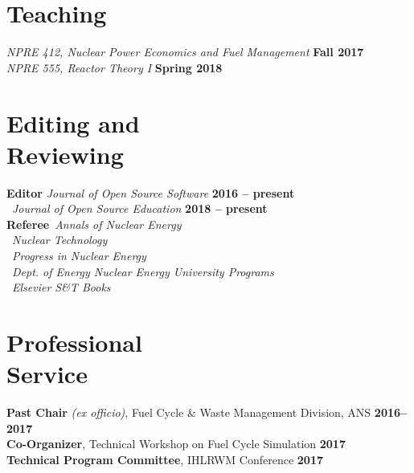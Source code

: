 \documentclass[margin,line]{resume}
\begin{document}
\begin{resume}
    \section{\mysidestyle Teaching}
               \textsl{NPRE 412, Nuclear Power Economics and Fuel Management} \hfill \textbf{Fall 2017}\\
               \textsl{NPRE 555, Reactor Theory I} \hfill \textbf{Spring 2018}
               \vspace{-2mm}
    \section{\mysidestyle Editing and\\Reviewing}
    \textbf{Editor} \hfill \emph{Journal of Open Source Software} \textbf{2016 -- present}\\%
     \mbox{}~\hfill \emph{Journal of Open Source Education} \textbf{2018 -- present}\\%
    \textbf{Referee}~\hfill\emph{Annals of Nuclear Energy}\\%
                            \mbox{}~\hfill\emph{Nuclear Technology}\\%
                            \mbox{}~\hfill\emph{Progress in Nuclear Energy}\\%
                            \mbox{}~\hfill \emph{Dept. of Energy Nuclear Energy University Programs}\\%
                            \mbox{}~\hfill\emph{Elsevier S\&T Books}%
               \vspace{-2mm}
    \section{\mysidestyle Professional\\Service}
    \textbf{Past Chair} \emph{(ex officio)}, Fuel Cycle \& Waste Management Division, ANS  \hfill \textbf{2016--2017}\vspace{.5mm}\\%
		\textbf{Co-Organizer}, Technical Workshop on Fuel Cycle Simulation \hfill \textbf{2017}\vspace{.5mm}\\%
		\textbf{Technical Program Committee}, IHLRWM Conference \hfill \textbf{2017}%
               \vspace{-2mm}

\end{resume}
\end{document}
